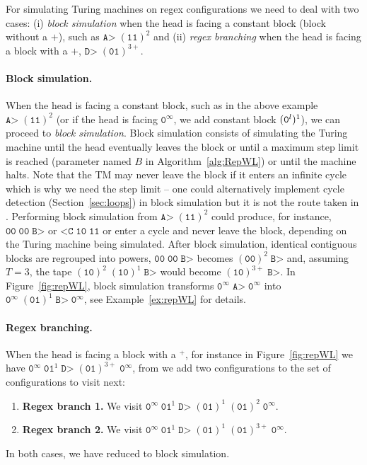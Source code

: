 For simulating Turing machines on regex configurations we need to deal with two cases: (i) \textit{block simulation} when the head is facing a constant block (\ie block without a $+$), such as $\texttt{A>} \; (\texttt{11})^2$ and (ii) \textit{regex branching} when the head is facing a block with a $+$, \eg $\texttt{D>} \; (\texttt{01})^{3+}$.

\paragraph{Block simulation.} When the head is facing a constant block, such as in the above example $\texttt{A>} \; (\texttt{11})^2$ (or if the head is facing $\texttt{0}^\infty$, we add constant block $(\texttt{0}^l)^1$), we can proceed to \textit{block simulation}.
Block simulation consists of simulating the Turing machine until the head eventually leaves the block or until a maximum step limit is reached (parameter named $B$ in Algorithm~\ref{alg:RepWL}) or until the machine halts. Note that the TM may never leave the block if it enters an infinite cycle which is why we need the step limit -- one could alternatively implement cycle detection (Section~\ref{sec:loops}) in block simulation but it is not the route taken in \CoqBB. Performing block simulation from $\texttt{A>} \; (\texttt{11})^2$ could produce, for instance, $\texttt{00}\; \texttt{00} \; \texttt{B>}$ or $\texttt{<C} \; \texttt{10} \; \texttt{11} $ or enter a cycle and never leave the block, depending on the Turing machine being simulated. After block simulation, identical contiguous blocks are regrouped into powers, \eg $\texttt{00} \; \texttt{00} \; \texttt{B>}$ becomes $(\texttt{00})^2 \; \texttt{B>}$ and, assuming $T=3$, the tape $(\texttt{10})^2\; (\texttt{10})^1\; \texttt{B>}$ would become $(\texttt{10})^{3+}\; \texttt{B>}$. In Figure~\ref{fig:repWL}, block simulation transforms $\texttt{0}^\infty \; \texttt{A>} \; \texttt{0}^\infty$ into $\texttt{0}^\infty \; (\texttt{01})^1 \; \texttt{B>} \; \texttt{0}^\infty$, see Example~\ref{ex:repWL} for details.

\paragraph{Regex branching.} When the head is facing a block with a $^+$, for instance in Figure~\ref{fig:repWL} we have $\texttt{0}^\infty \; \texttt{01}^1 \; \texttt{D>} \; (\texttt{01})^{3+} \; \texttt{0}^\infty$, from we add two configurations to the set of configurations to visit next:
\begin{enumerate}
    \item \textbf{Regex branch 1.} We visit $\texttt{0}^\infty \; \texttt{01}^1 \; \texttt{D>} \; (\texttt{01})^1 \; (\texttt{01})^{2} \; \texttt{0}^\infty$.
    \item \textbf{Regex branch 2.} We visit $\texttt{0}^\infty \; \texttt{01}^1 \; \texttt{D>} \; (\texttt{01})^1 \; (\texttt{01})^{3+} \; \texttt{0}^\infty$.
\end{enumerate}
In both cases, we have reduced to block simulation.

